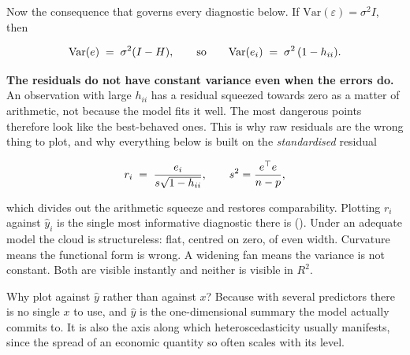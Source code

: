 \documentclass[
  letterpaper,
  10pt,
  twoside,
  openright,
  numbers=noenddot,
  chapterprefix=true]{scrbook}
\begin{document}
Now the consequence that governs every diagnostic below. If
\(\mathrm{Var}(\varepsilon) = \sigma^2 I\), then

\[
\mathrm{Var}(e) \thickspace=\thickspace \sigma^{2}(I - H),
\qquad\text{so}\qquad
\mathrm{Var}(e_i) \thickspace=\thickspace \sigma^{2}\thinspace(1 - h_{ii}).
\]

\textbf{The residuals do not have constant variance even when the errors
do.} An observation with large \(h_{ii}\) has a residual squeezed
towards zero as a matter of arithmetic, not because the model fits it
well. The most dangerous points therefore look like the best-behaved
ones. This is why raw residuals are the wrong thing to plot, and why
everything below is built on the \emph{standardised} residual

\[
r_i \thickspace=\thickspace \frac{e_i}{s\sqrt{1 - h_{ii}}},
\qquad s^2 = \frac{e^{\top}e}{n-p},
\]

which divides out the arithmetic squeeze and restores comparability.
Plotting \(r_i\) against \(\hat y_i\) is the single most informative
diagnostic there is (). Under an adequate model the cloud is structureless: flat,
centred on zero, of even width. Curvature means the functional form is
wrong. A widening fan means the variance is not constant. Both are
visible instantly and neither is visible in \(R^2\).

Why plot against \(\hat y\) rather than against \(x\)? Because with
several predictors there is no single \(x\) to use, and \(\hat y\) is
the one-dimensional summary the model actually commits to. It is also
the axis along which heteroscedasticity usually manifests, since the
spread of an economic quantity so often scales with its level.
\end{document}
